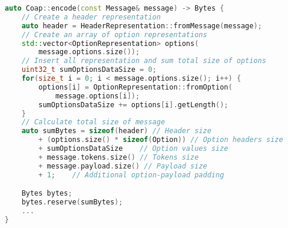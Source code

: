 \documentclass[a4paper, titlepage,12pt]{article}
\begin{document}
		\begin{lstlisting}[language=C++]
auto Coap::encode(const Message& message) -> Bytes {
	// Create a header representation
	auto header = HeaderRepresentation::fromMessage(message);
	// Create an array of option representations
	std::vector<OptionRepresentation> options(
		message.options.size());
	// Insert all representation and sum total size of options
	uint32_t sumOptionsDataSize = 0;
	for(size_t i = 0; i < message.options.size(); i++) {
		options[i] = OptionRepresentation::fromOption(
			message.options[i]);
		sumOptionsDataSize += options[i].getLength();
	}
	// Calculate total size of message
	auto sumBytes = sizeof(header) // Header size
		+ (options.size() * sizeof(Option)) // Option headers size
		+ sumOptionsDataSize 	// Option values size
		+ message.tokens.size() // Tokens size
		+ message.payload.size() // Payload size
		+ 1;	// Additional option-payload padding

	Bytes bytes;
	bytes.reserve(sumBytes);
	...
}
		\end{lstlisting}
	\printbibliography
\end{document}
